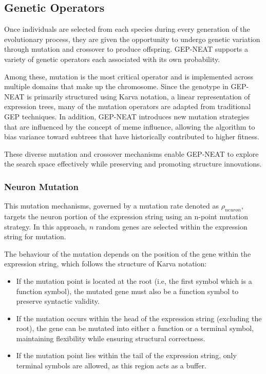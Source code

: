 \subsection{Genetic Operators}
Once individuals are selected from each species during every generation of the evolutionary process, they are given the opportunity to undergo genetic variation through mutation and crossover to produce offspring. GEP-NEAT supports a variety of genetic operators each associated with its own probability.

\parbreak\noindent Among these, mutation is the most critical operator and is implemented across multiple domains that make up the chromosome. Since the genotype in GEP-NEAT is primarily structured using Karva notation, a linear representation of expression trees, many of the mutation operators are adapted from traditional GEP techniques. In addition, GEP-NEAT introduces new mutation strategies that are influenced by the concept of meme influence, allowing the algorithm to bias variance toward subtrees that have historically contributed to higher fitness.

\parbreak\noindent These diverse mutation and crossover mechanisms enable GEP-NEAT to explore the search space effectively while preserving and promoting structure innovations.

\subsubsection{Neuron Mutation}
This mutation mechanisms, governed by a mutation rate denoted as $\rho_{neuron}$, targets the neuron portion of the expression string using an n-point mutation strategy. In this approach, $n$ random genes are selected within the expression string for mutation.

\parbreak\noindent The behaviour of the mutation depends on the position of the gene within the expression string, which follows the structure of Karva notation:
\begin{itemize}
	\item If the mutation point is located at the root (i.e, the first symbol which is a function symbol), the mutated gene must also be a function symbol to preserve syntactic validity.
	\item If the mutation occurs within the head of the expression string (excluding the root), the gene can be mutated into either a function or a terminal symbol, maintaining flexibility while ensuring structural correctness.
	\item If the mutation point lies within the tail of the expression string, only terminal symbols are allowed, as this region acts as a buffer.
\end{itemize}

